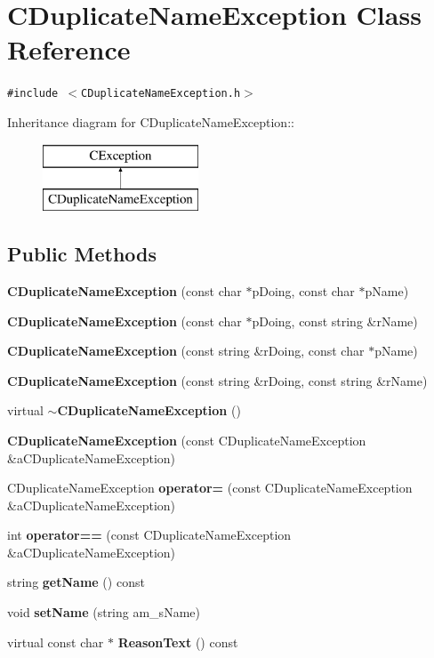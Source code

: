 \section{CDuplicate\-Name\-Exception  Class Reference}
\label{classCDuplicateNameException}
{\tt \#include $<$CDuplicate\-Name\-Exception.h$>$}

Inheritance diagram for CDuplicate\-Name\-Exception::\begin{figure}[H]
\begin{center}
\leavevmode
\includegraphics[height=2cm]{classCDuplicateNameException}
\end{center}
\end{figure}
\subsection*{Public Methods}
\begin{CompactItemize}
\item 
{\bf CDuplicate\-Name\-Exception} (const char $\ast$p\-Doing, const char $\ast$p\-Name)
\item 
{\bf CDuplicate\-Name\-Exception} (const char $\ast$p\-Doing, const string \&r\-Name)
\item 
{\bf CDuplicate\-Name\-Exception} (const string \&r\-Doing, const char $\ast$p\-Name)
\item 
{\bf CDuplicate\-Name\-Exception} (const string \&r\-Doing, const string \&r\-Name)
\item 
virtual {\bf $\sim$CDuplicate\-Name\-Exception} ()
\item 
{\bf CDuplicate\-Name\-Exception} (const CDuplicate\-Name\-Exception \&a\-CDuplicate\-Name\-Exception)
\item 
CDuplicate\-Name\-Exception {\bf operator=} (const CDuplicate\-Name\-Exception \&a\-CDuplicate\-Name\-Exception)
\item 
int {\bf operator==} (const CDuplicate\-Name\-Exception \&a\-CDuplicate\-Name\-Exception)
\item 
string {\bf get\-Name} () const
\item 
void {\bf set\-Name} (string am\_\-s\-Name)
\item 
virtual const char $\ast$ {\bf Reason\-Text} () const
\end{CompactItemize}

